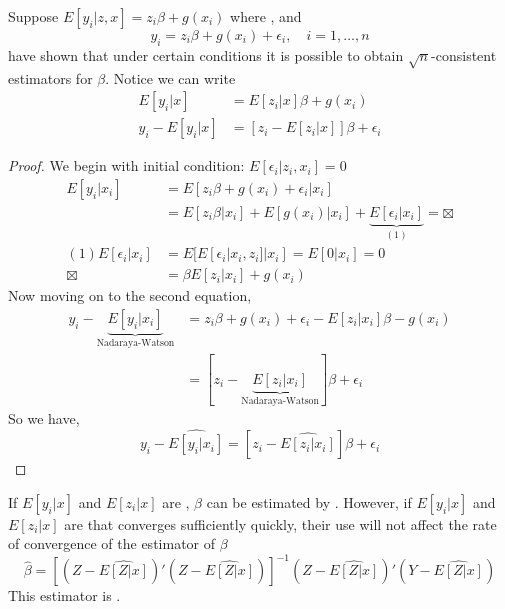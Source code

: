 Suppose $E[y_i|z,x] = z_i\beta + g(x_i)$ where , and 
\begin{equation*}
    y_i = z_i\beta + g(x_i) + \epsilon_i,\quad i=1,\ldots,n
\end{equation*}
 have shown that under certain conditions it is possible to obtain $\sqrt{n}$-consistent estimators for $\beta$.
Notice we can write 
\begin{align*}
    E[y_i|x] & = E[z_i|x]\beta + g(x_i)\\
    y_i-E[y_i|x] & = [z_i-E[z_i|x]]\beta + \epsilon_i
\end{align*}
\begin{proof}
    We begin with initial condition: $E[\epsilon_i|z_i,x_i] = 0$
    \begin{align*}
        E[y_i|x_i] & = E[z_i\beta+g(x_i)+\epsilon_i|x_i]\\
        & = E[z_i\beta|x_i] + E[g(x_i)|x_i] + \underbrace{E[\epsilon_i|x_i]}_{(1)} = \boxtimes\\
        (1) E[\epsilon_i|x_i] & = E[E[\epsilon_i|x_i,z_i]|x_i] = E[0|x_i] = 0\\
        \boxtimes & = \beta E[z_i|x_i] + g(x_i)
    \end{align*}
    Now moving on to the second equation,
    \begin{align*}
        y_i - \underbrace{E[y_i|x_i]}_{\text{Nadaraya-Watson}} 
        & = z_i\beta + g(x_i) + \epsilon_i - E[z_i|x_i]\beta - g(x_i)\\
        & = [z_i - \underbrace{E[z_i|x_i]}_{\text{Nadaraya-Watson}}]\beta + \epsilon_i
    \end{align*}
    So we have,
    \begin{equation*}
        y_i - \widehat{E[y_i|x_i]} = [z_i - \widehat{E[z_i|x_i]}]\beta+\epsilon_i
    \end{equation*}
\end{proof}

If $E[y_i|x]$ and $E[z_i|x]$ are , $\beta$ can be estimated by . 
However, if $E[y_i|x]$ and $E[z_i|x]$ are  that converges sufficiently quickly,
their use will not affect the rate of convergence of the  estimator of $\beta$
\begin{equation*}
    \hat{\beta} = \left[(Z-\widehat{E[Z|x]})'(Z-\widehat{E[Z|x]})\right]^{-1}(Z-\widehat{E[Z|x]})'(Y-\widehat{E[Z|x]})
\end{equation*}
This estimator is .






